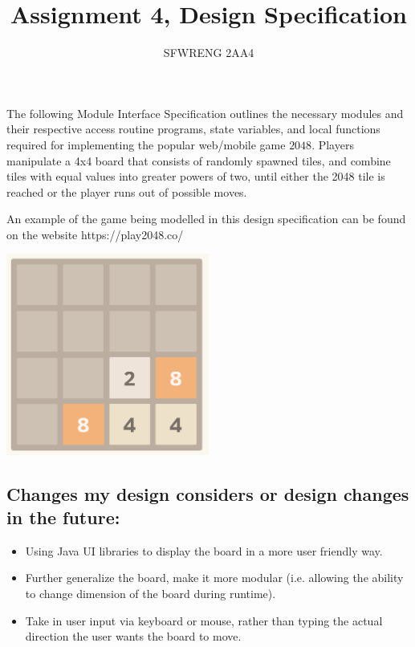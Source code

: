 \documentclass[12pt]{article}
\title{Assignment 4, Design Specification}
\author{SFWRENG 2AA4}
\begin{document}
\maketitle
The following Module Interface Specification outlines the necessary modules and their respective access routine programs, state variables, and local functions required for implementing the popular web/mobile game $2048$. Players manipulate a 4x4 board that consists of randomly spawned tiles, and combine tiles with equal values into greater powers of two, until either the 2048 tile is reached or the player runs out of possible moves.

\medskip

An example of the game being modelled in this design specification can be found on the website https://play2048.co/

\begin{center}
\includegraphics[width=0.5\textwidth]{images/2048game.png}
\end{center}

\newpage

\subsection*{Changes my design considers or design changes in the future:}

\begin{itemize}
  \item Using Java UI libraries to display the board in a more user friendly way.
  \item Further generalize the board, make it more modular (i.e. allowing the ability to change dimension of the board during runtime).
  \item Take in user input via keyboard or mouse, rather than typing the actual direction the user wants the board to move.
\end{itemize}
\end{document}

